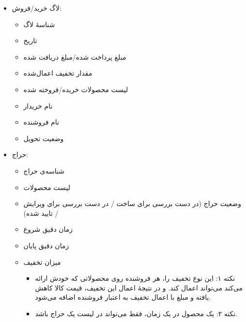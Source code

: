 \documentclass[]{article}
\begin{document}
\begin{itemize}
\item
لاگ خرید/فروش:

\begin{itemize}

\item
شناسهٔ لاگ

\item
تاریخ

\item
مبلغ پرداخت شده/مبلغ دریافت شده

\item
مقدار تخفیف اعمال‌شده

\item
لیست محصولات خریده/فروخته شده

\item
نام خریدار

\item
نام فروشنده

\item
وضعیت تحویل

\end{itemize}

\item
حراج:

\begin{itemize}

\item
شناسه‌ی حراج 

\item
لیست محصولات

\item
وضعیت حراج (در دست بررسی برای ساخت / در دست بررسی برای ویرایش / تایید شده)

\item
زمان دقیق شروع

\item
زمان دقیق پایان

\item
میزان تخفیف


\begin{itemize}[label = $\blacksquare$]
\item
نکته ۱: این نوع تخفیف را، هر فروشنده روی محصولاتی که خودش ارائه می‌کند می‌تواند اعمال کند. و 
در نتیجهٔ اعمال این تخفیف، قیمت کالا کاهش یافته و مبلغ با اعمال تخفیف به اعتبار فروشنده اضافه می‌شود.

\item
نکته ۲:‌ یک محصول در یک زمان، فقط می‌تواند در لیست یک حراج باشد.
\end{itemize}

\end{itemize}


\end{itemize}
\end{document}
